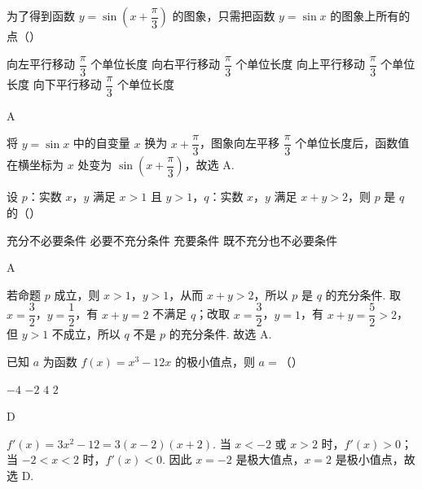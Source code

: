 \begin{problem}
为了得到函数 \(y=\sin\left(x+\dfrac{\pi}{3}\right)\) 的图象，只需把函数 \(y=\sin x\) 的图象上所有的点（\quad）

\choices
    {向左平行移动 \(\dfrac{\pi}{3}\) 个单位长度}
    {向右平行移动 \(\dfrac{\pi}{3}\) 个单位长度}
    {向上平行移动 \(\dfrac{\pi}{3}\) 个单位长度}
    {向下平行移动 \(\dfrac{\pi}{3}\) 个单位长度}
\end{problem}

\begin{answer}
A
\end{answer}

\begin{solution}
将 \(y=\sin x\) 中的自变量 \(x\) 换为 \(x+\dfrac{\pi}{3}\)，图象向左平移 \(\dfrac{\pi}{3}\) 个单位长度后，函数值在横坐标为 \(x\) 处变为 \(\sin\left(x+\dfrac{\pi}{3}\right)\)，故选 A.
\end{solution}

\begin{problem}
设 \(p\)：实数 \(x\)，\(y\) 满足 \(x>1\) 且 \(y>1\)，\(q\)：实数 \(x\)，\(y\) 满足 \(x+y>2\)，则 \(p\) 是 \(q\) 的（\quad）

\choices
    {充分不必要条件}
    {必要不充分条件}
    {充要条件}
    {既不充分也不必要条件}
\end{problem}

\begin{answer}
A
\end{answer}

\begin{solution}
若命题 \(p\) 成立，则 \(x>1\)，\(y>1\)，从而 \(x+y>2\)，所以 \(p\) 是 \(q\) 的充分条件. 取 \(x=\dfrac32\)，\(y=\dfrac12\)，有 \(x+y=2\) 不满足 \(q\)；改取 \(x=\dfrac32\)，\(y=1\)，有 \(x+y=\dfrac52>2\)，但 \(y>1\) 不成立，所以 \(q\) 不是 \(p\) 的充分条件. 故选 A.
\end{solution}

\begin{problem}
已知 \(a\) 为函数 \(f(x)=x^3-12x\) 的极小值点，则 \(a=\)（\quad）

\choices
    {\(-4\)}
    {\(-2\)}
    {\(4\)}
    {\(2\)}
\end{problem}

\begin{answer}
D
\end{answer}

\begin{solution}
\(f'(x)=3x^2-12=3(x-2)(x+2)\). 当 \(x<-2\) 或 \(x>2\) 时，\(f'(x)>0\)；当 \(-2<x<2\) 时，\(f'(x)<0\). 因此 \(x=-2\) 是极大值点，\(x=2\) 是极小值点，故选 D.
\end{solution}


